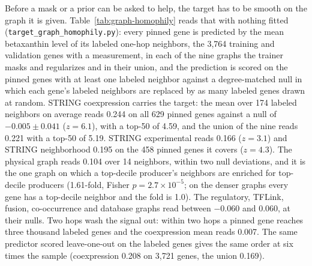 Before a mask or a prior can be asked to help, the target has to be smooth on the graph
it is given. Table~\ref{tab:graph-homophily} reads that with nothing fitted
(\texttt{target\_graph\_homophily.py}): every pinned gene is predicted by the mean
betaxanthin level of its labeled one-hop neighbors, the 3,764 training and validation
genes with a measurement, in each of the nine graphs the trainer masks and regularizes
and in their union, and the prediction is scored on the pinned genes with at least one
labeled neighbor against a degree-matched null in which each gene's labeled neighbors
are replaced by as many labeled genes drawn at random. STRING coexpression carries the
target: the mean over 174 labeled neighbors on average reads 0.244 on all 629 pinned
genes against a null of $-0.005 \pm 0.041$ ($z = 6.1$), with a top-50 of 4.59, and the
union of the nine reads 0.221 with a top-50 of 5.19. STRING experimental reads 0.166
($z = 3.1$) and STRING neighborhood 0.195 on the 458 pinned genes it covers ($z = 4.3$).
The physical graph reads 0.104 over 14 neighbors, within two null deviations, and it is
the one graph on which a top-decile producer's neighbors are enriched for top-decile
producers (1.61-fold, Fisher $p = 2.7 \times 10^{-5}$; on the denser graphs every gene
has a top-decile neighbor and the fold is 1.0). The regulatory, TFLink, fusion,
co-occurrence and database graphs read between $-0.060$ and 0.060, at their nulls. Two
hops wash the signal out: within two hops a pinned gene reaches three thousand labeled
genes and the coexpression mean reads 0.007. The same predictor scored leave-one-out on
the labeled genes gives the same order at six times the sample (coexpression 0.208 on
3,721 genes, the union 0.169).

